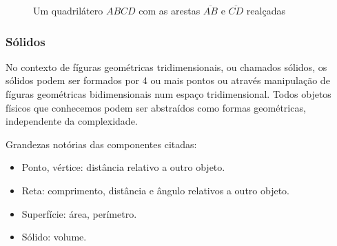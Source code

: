 \begin{multicols*}{2}
    \begin{figure}[H]
        \centering
        \caption{Um quadrilátero $ABCD$ com as arestas $\overline{AB}$ e $\overline{CD}$ realçadas}
    \end{figure}


    \subsubsection*{Sólidos}
    No contexto de fíguras geométricas tridimensionais, ou chamados sólidos, os sólidos podem ser formados por 4 ou
    mais pontos ou através manipulação de fíguras geométricas bidimensionais num espaço tridimensional.
    Todos objetos físicos que conhecemos podem ser abstraídos como formas geométricas, independente da complexidade.

    Grandezas notórias das componentes citadas:
    \begin{itemize}
        \setlength\itemsep{1.15pt}
        \item Ponto, vértice: distância relativo a outro objeto.
        \item Reta: comprimento, distância e ângulo relativos a outro objeto.
        \item Superfície: área, perímetro.
        \item Sólido: volume.
    \end{itemize}


\end{multicols*}
